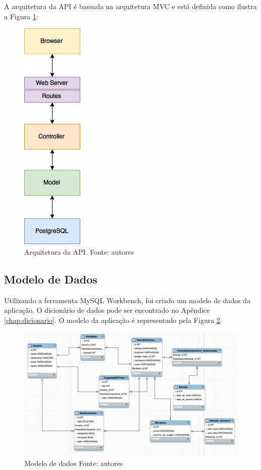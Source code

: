 A arquitetura da API é baseada na arquitetura MVC e está definida como ilustra a Figura \ref{img:arquitetura}:

\begin{figure}[H]
    \centering
    \includegraphics[scale=0.5]{figuras/api_arch.png}
    \caption[Arquitetura da API]{Arquitetura da API. Fonte: autores}
    \label{img:arquitetura}
\end{figure}


\subsection{Modelo de Dados}

Utilizando a ferramenta MySQL Workbench, foi criado um modelo de dados da aplicação. O dicionário de dados pode ser encontrado no Apêndice \ref{chap:dicionario}. O modelo da aplicação é representado pela Figura \ref{img:modelo_de_dados}.

\begin{figure}[H]
    \centering
    \includegraphics[scale=0.5]{figuras/modelagem_traduzida.png}
    \caption[Modelo de dados]{Modelo de dados Fonte: autores}
    \label{img:modelo_de_dados}
\end{figure}

